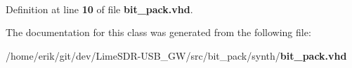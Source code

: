\paragraph[{std\+\_\+logic\+\_\+1164}]{\hspace{0.3cm}{\ttfamily [Package]}}\label{classbit__pack_acd03516902501cd1c7296a98e22c6fcb}


Definition at line {\bf 10} of file {\bf bit\+\_\+pack.\+vhd}.



The documentation for this class was generated from the following file\+:\begin{DoxyCompactItemize}
\item 
/home/erik/git/dev/\+Lime\+S\+D\+R-\/\+U\+S\+B\+\_\+\+G\+W/src/bit\+\_\+pack/synth/{\bf bit\+\_\+pack.\+vhd}\end{DoxyCompactItemize}
